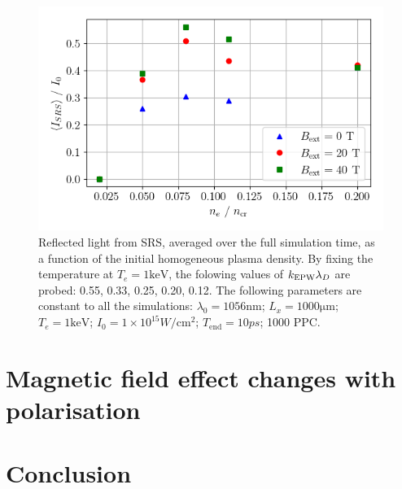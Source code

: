 \begin{figure}[ht]
   \centering
    \includegraphics[width=0.9\columnwidth]{Chapters/C6_magSRS/kld_scan_SRS_scaling.png}
    \caption{Reflected light from SRS, averaged over the full simulation time, as a function of the initial homogeneous plasma density. By fixing the temperature at $T_e = 1\si{\kilo\electronvolt}$, the folowing values of $k_\mathrm{EPW}\lambda_D$ are probed: 0.55, 0.33, 0.25, 0.20, 0.12. The following parameters are constant to all the simulations: 
 $\lambda_0 = 1056 \si{\nano\metre}$; $L_x = 1000 \si{\micro\metre}$; $T_e = 1 \si{\kilo\electronvolt}$; $I_0 = 1\times 10^{15}\si{W/\cm^2}$; $T_{\mathrm{end}}=10 \si{ps}$; 1000 PPC.}
    \label{fig:SRS_EPOCH}
\end{figure}{}


\section{Magnetic field effect changes with polarisation}

\section{Conclusion}



